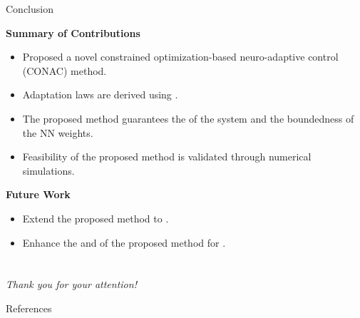\documentclass[8pt, aspectratio=169]{beamer}
\newcommand{\ctxt}[2]{\color{#1}{#2}\color{black} }
\begin{document}
\begin{frame}{Conclusion}
    
  \textbf{Summary of Contributions}
  \begin{itemize}
    \item Proposed a novel constrained optimization-based neuro-adaptive control (CONAC) method.
    \item Adaptation laws are derived using \ctxt{airforceblue}{constrained optimization method}.
    \item The proposed method guarantees the \ctxt{awesome}{stability }of the system and the boundedness of the NN weights.
    \item Feasibility of the proposed method is validated through numerical simulations.
  \end{itemize}

  \textbf{Future Work}
  \begin{itemize}
    \item Extend the proposed method to \ctxt{airforceblue}{state constraints}.
    \item Enhance the \ctxt{awesome}{robustness }and \ctxt{awesome}{flexibility }of the proposed method for \ctxt{airforceblue}{various systems}.
  \end{itemize}

\end{frame}

\section{}
\begin{frame}{}
    \centering \Large
    \emph{Thank you for your attention!}
\end{frame}

\begin{frame}[allowframebreaks]{References}

  
  

\end{frame}
\end{document}
